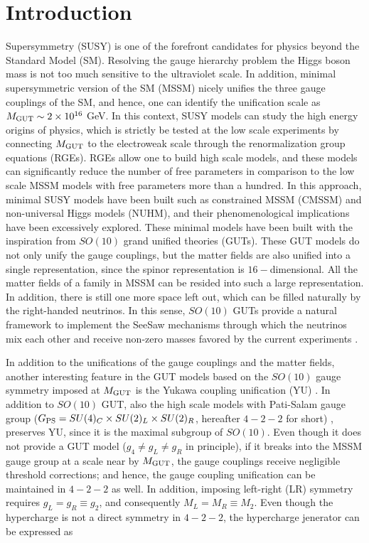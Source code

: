 \documentclass[12pt]{article}
\newcommand{\mgut}{M_{{\rm GUT}}}
\newcommand{\PS}{SU(4)_{C}\times SU(2)_{L}\times SU(2)_{R}}
\begin{document}



\section{Introduction}
\label{sec:Intro}

Supersymmetry (SUSY) is one of the forefront candidates for physics beyond the Standard Model (SM). Resolving the gauge hierarchy problem the Higgs boson mass is not too much sensitive to the ultraviolet scale. In addition, minimal supersymmetric version of the SM (MSSM) nicely unifies the three gauge couplings of the SM, and hence, one can identify the unification scale as $\mgut \sim 2\times 10^{16}$ GeV. In this context, SUSY models can study the high energy origins of physics, which is strictly be tested at the low scale experiments by connecting $\mgut$ to the electroweak scale through the renormalization group equations (RGEs). RGEs allow one to build high scale models, and these models can significantly reduce the number of free parameters in comparison to the low scale MSSM models with free parameters more than a hundred. In this approach, minimal SUSY models have been built such as constrained MSSM (CMSSM) and non-universal Higgs models (NUHM), and their phenomenological implications have been excessively explored. These minimal models have been built with the inspiration from $SO(10)$ grand unified theories (GUTs). These GUT models do not only unify the gauge couplings, but the matter fields are also unified into a single representation, since the spinor representation is $16-$dimensional. All the matter fields of a family in MSSM can be resided into such a large representation. In addition, there is still one more space left out, which can be filled naturally by the right-handed neutrinos. In this sense, $SO(10)$ GUTs provide a natural framework to implement the SeeSaw mechanisms through which the neutrinos mix each other and receive non-zero masses favored by the current experiments \cite{Wendell:2010md}.

In addition to the unifications of the gauge couplings and the matter fields, another interesting feature in the GUT models based on the $SO(10)$ gauge symmetry imposed at $\mgut$ is the Yukawa coupling unification (YU) \cite{big-422}. In addition to $SO(10)$ GUT, also the high scale models with Pati-Salam gauge group ($G_{{\rm PS}}=\PS$, hereafter $4-2-2$ for short) \cite{pati-salam}, preserves YU, since it is the maximal subgroup of $SO(10)$. Even though it does not provide a GUT model ($g_{4}\neq g_{L}\neq g_{R}$ in principle), if it breaks into the MSSM gauge group at a scale near by $\mgut$, the gauge couplings receive negligible threshold corrections; and hence, the gauge coupling unification can be maintained in $4-2-2$ as well. In addition,  imposing left-right (LR) symmetry requires $g_{L}=g_{R}\equiv g_{2}$, and consequently $M_{L}=M_{R}\equiv M_{2}$. Even though the hypercharge is not a direct symmetry in $4-2-2$, the hypercharge jenerator can be expressed as 
\end{document}

